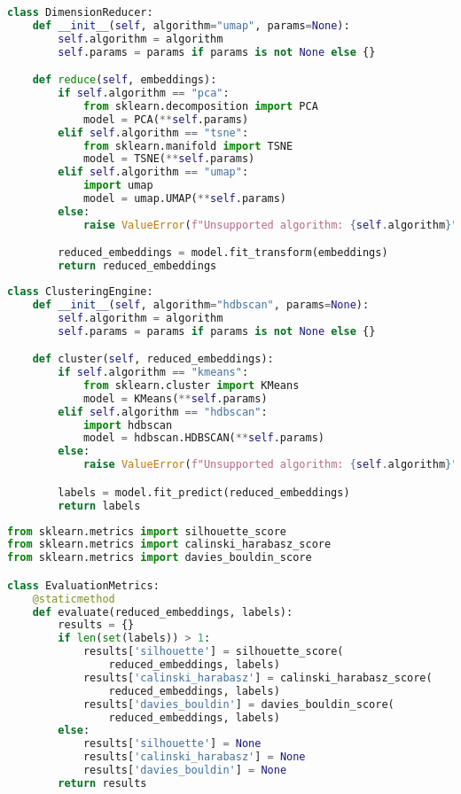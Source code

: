 \begin{lstlisting}[language=Python, caption={\texttt{dimension\_reducer.py}}, label={prco:dimension-reducer}]
class DimensionReducer:
    def __init__(self, algorithm="umap", params=None):
        self.algorithm = algorithm
        self.params = params if params is not None else {}

    def reduce(self, embeddings):
        if self.algorithm == "pca":
            from sklearn.decomposition import PCA
            model = PCA(**self.params)
        elif self.algorithm == "tsne":
            from sklearn.manifold import TSNE
            model = TSNE(**self.params)
        elif self.algorithm == "umap":
            import umap
            model = umap.UMAP(**self.params)
        else:
            raise ValueError(f"Unsupported algorithm: {self.algorithm}")

        reduced_embeddings = model.fit_transform(embeddings)
        return reduced_embeddings
\end{lstlisting}

\begin{lstlisting}[language=Python, caption={\texttt{clustering\_engine.py}}, label={prco:clustering-engine}]
class ClusteringEngine:
    def __init__(self, algorithm="hdbscan", params=None):
        self.algorithm = algorithm
        self.params = params if params is not None else {}

    def cluster(self, reduced_embeddings):
        if self.algorithm == "kmeans":
            from sklearn.cluster import KMeans
            model = KMeans(**self.params)
        elif self.algorithm == "hdbscan":
            import hdbscan
            model = hdbscan.HDBSCAN(**self.params)
        else:
            raise ValueError(f"Unsupported algorithm: {self.algorithm}")

        labels = model.fit_predict(reduced_embeddings)
        return labels
\end{lstlisting}

\begin{lstlisting}[language=Python, caption={\texttt{evaluation\_metrics.py}}, label={prco:evaluation-metrics}]
from sklearn.metrics import silhouette_score
from sklearn.metrics import calinski_harabasz_score
from sklearn.metrics import davies_bouldin_score

class EvaluationMetrics:
    @staticmethod
    def evaluate(reduced_embeddings, labels):
        results = {}
        if len(set(labels)) > 1:
            results['silhouette'] = silhouette_score(
                reduced_embeddings, labels)
            results['calinski_harabasz'] = calinski_harabasz_score(
                reduced_embeddings, labels)
            results['davies_bouldin'] = davies_bouldin_score(
                reduced_embeddings, labels)
        else:
            results['silhouette'] = None
            results['calinski_harabasz'] = None
            results['davies_bouldin'] = None
        return results
\end{lstlisting}

